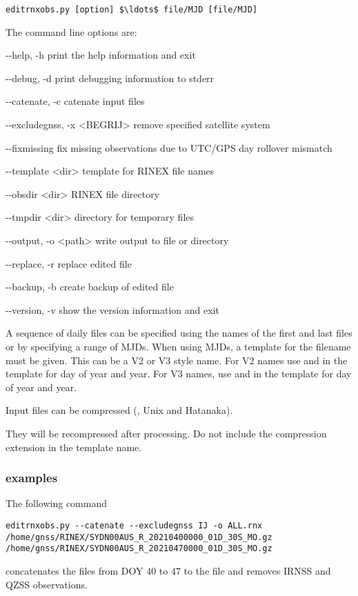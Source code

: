 \begin{lstlisting}[mathescape=true]
editrnxobs.py [option] $\ldots$ file/MJD [file/MJD] 
\end{lstlisting}
The command line options are:
\begin{description*}
	\item[-{}-help, -h]            print the help information and exit
	\item[-{}-debug, -d]           print debugging information to stderr
	\item[-{}-catenate, -c ]       catenate input files
	\item[-{}-excludegnss, -x  \textless{BEGRIJ}\textgreater]   remove specified satellite system	
	\item[-{}-fixmissing ]         fix missing observations due to UTC/GPS day rollover mismatch
  
	\item[-{}-template \textless{dir}\textgreater]    template for RINEX file names
	\item[-{}-obsdir   \textless{dir}\textgreater]    RINEX file directory
	\item[-{}-tmpdir   \textless{dir}\textgreater]    directory for temporary files
  
	\item[-{}-output, -o \textless{path}\textgreater] write output to file or directory
	 
	\item[-{}-replace, -r]         replace edited file
 
	\item[-{}-backup, -b  ]        create backup of edited file
	\item[-{}-version, -v ]        show the version information and exit
\end{description*}

A sequence of daily files can be specified using the names of the first and  last files or by specifying a range of MJDs.
When using MJDs, a template for the filename must be given. This can be a V2 or V3 style name.
For V2 names use  and  in the template for day of year and year.
For V3 names, use  and   in the template for day of year and year.

Input files can be compressed (, Unix  and Hatanaka). 

They will be recompressed after processing.
Do not include the compression extension in the template name.

\subsubsection{examples}

The following command
\begin{lstlisting}[mathescape=true]
editrnxobs.py --catenate --excludegnss IJ -o ALL.rnx  /home/gnss/RINEX/SYDN00AUS_R_20210400000_01D_30S_MO.gz /home/gnss/RINEX/SYDN00AUS_R_20210470000_01D_30S_MO.gz
\end{lstlisting}
concatenates the files from DOY 40 to 47 to the file  and removes IRNSS and QZSS observations.

